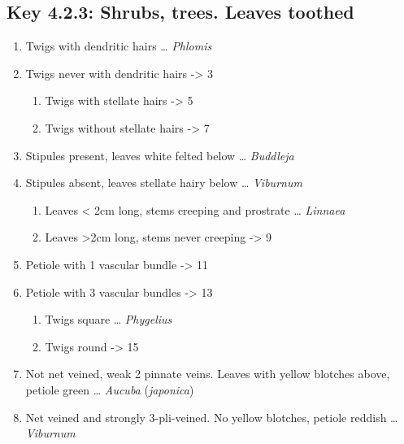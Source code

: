 \documentclass[openany]{book}
\providecommand{\tightlist}{%
  \setlength{\itemsep}{0pt}\setlength{\parskip}{0pt}}
\begin{document}
\hypertarget{key-4.2.3-shrubs-trees.-leaves-toothed}{%
\subsection*{Key 4.2.3: Shrubs, trees. Leaves toothed}\label{key-4.2.3-shrubs-trees.-leaves-toothed}}

\begin{enumerate}
\def\labelenumi{\arabic{enumi}.}
\tightlist
\item
  Twigs with dendritic hairs \ldots{} \emph{Phlomis}
\item
  Twigs never with dendritic hairs -\textgreater{} 3

  \begin{enumerate}
  \def\labelenumii{\arabic{enumii}.}
  \setcounter{enumii}{2}
  \tightlist
  \item
    Twigs with stellate hairs -\textgreater{} 5
  \item
    Twigs without stellate hairs -\textgreater{} 7
  \end{enumerate}
\item
  Stipules present, leaves white felted below \ldots{} \emph{Buddleja}
\item
  Stipules absent, leaves stellate hairy below \ldots{} \emph{Viburnum}

  \begin{enumerate}
  \def\labelenumii{\arabic{enumii}.}
  \setcounter{enumii}{6}
  \tightlist
  \item
    Leaves \textless{} 2cm long, stems creeping and prostrate \ldots{} \emph{Linnaea}
  \item
    Leaves \textgreater{}2cm long, stems never creeping -\textgreater{} 9
  \end{enumerate}
\item
  Petiole with 1 vascular bundle -\textgreater{} 11
\item
  Petiole with 3 vascular bundles -\textgreater{} 13

  \begin{enumerate}
  \def\labelenumii{\arabic{enumii}.}
  \setcounter{enumii}{10}
  \tightlist
  \item
    Twigs square \ldots{} \emph{Phygelius}
  \item
    Twigs round -\textgreater{} 15
  \end{enumerate}
\item
  Not net veined, weak 2 pinnate veins. Leaves with yellow blotches above, petiole green \ldots{} \emph{Aucuba} (\emph{japonica})
\item
  Net veined and strongly 3-pli-veined. No yellow blotches, petiole reddish \ldots{} \emph{Viburnum}


\end{enumerate}
\end{document}
